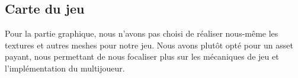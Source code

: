 \subsection{Carte du jeu}

    Pour la partie graphique, nous n'avons pas choisi de réaliser
    nous-même les textures et autres meshes pour notre jeu.
    Nous avons plutôt opté pour un asset payant,
    nous permettant de nous focaliser plus sur les mécaniques de jeu et l'implémentation du multijoueur.